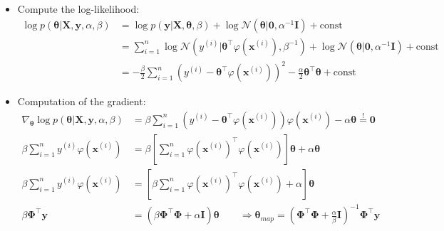 \begin{frame}
	\begin{itemize}
		\item Compute the log-likelihood:
		\begin{align}
			\log p(\bm{\theta} \vert \bm{X}, \bm{y}, \alpha, \beta)
				&= \log p(\bm{y} \vert \bm{X}, \bm{\theta}, \beta) + \log \mathcal{N}(\bm{\theta} \vert \bm{0}, \alpha^{-1} \bm{I}) + \text{const} \\
				&= \sum_{i=1}^n \log \mathcal{N}(y^{(i)} \vert \bm{\theta}^{\intercal} \varphi(\bm{x}^{(i)}), \beta^{-1}) +
					\log \mathcal{N}(\bm{\theta} \vert \bm{0}, \alpha^{-1} \bm{I}) + \text{const} \\
				&= -\frac{\beta}{2} \sum_{i=1}^n (y^{(i)} - \bm{\theta}^{\intercal} \varphi(\bm{x}^{(i)}))^2 - \frac{\alpha}{2}\bm{\theta}^{\intercal} \bm{\theta} + \text{const}
		\end{align}
		\item Computation of the gradient:
		\begin{align}
			\nabla_{\bm{\theta}} \log p(\bm{\theta} \vert \bm{X}, \bm{y}, \alpha, \beta)
				&= \beta \sum_{i=1}^n (y^{(i)} - \bm{\theta}^{\intercal} \varphi(\bm{x}^{(i)})) \varphi(\bm{x}^{(i)}) - \alpha \bm{\theta} \overset{!}{=} \bm{0} \\
			\beta \sum_{i=1}^n y^{(i)} \varphi(\bm{x}^{(i)})
				&= \beta \left[ \sum_{i=1}^n \varphi(\bm{x}^{(i)})^{\intercal} \varphi(\bm{x}^{(i)}) \right] \bm{\theta} + \alpha \bm{\theta} \\
			\beta \sum_{i=1}^n y^{(i)} \varphi(\bm{x}^{(i)})
				&= \left[ \beta \sum_{i=1}^n \varphi(\bm{x}^{(i)})^{\intercal} \varphi(\bm{x}^{(i)}) + \alpha \right] \bm{\theta} \\
			\beta \bm{\Phi}^{\intercal} \bm{y}
				&= (\beta \bm{\Phi}^{\intercal} \bm{\Phi} + \alpha \bm{I}) \bm{\theta} \qquad \Rightarrow
					\bm{\theta}_{map} = \left( \bm{\Phi}^{\intercal} \bm{\Phi} + \frac{\alpha}{\beta} \bm{I} \right)^{-1} \bm{\Phi}^{\intercal} \bm{y}
		\end{align}
	\end{itemize}
\end{frame}


